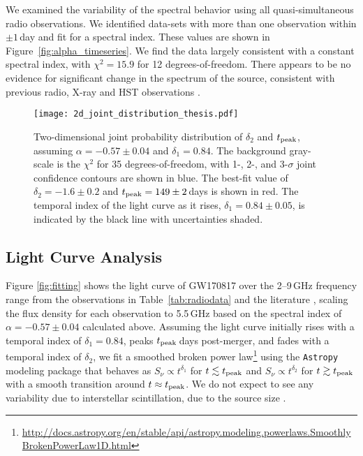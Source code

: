 We examined the variability of the spectral behavior using all quasi-simultaneous radio observations. We identified data-sets with more than one observation within $\pm1\,$day and fit for a spectral index. These values are shown in Figure~\ref{fig:alpha_timeseries}. We find the data largely consistent with a constant spectral index, with $\chi^2=15.9$ for 12 degrees-of-freedom. There appears to be no evidence for significant change in the spectrum of the source, consistent with previous radio, X-ray and HST observations \citep{2018A&A...613L...1D,2018NatAs...2..751L,2018Natur.554..207M,2018ApJ...856L..18M,2018ApJ...867...57R}. 

\begin{figure}[h!]
\texttt{[image: 2d\_joint\_distribution\_thesis.pdf]}
\caption[Joint probability distribution of the peak time and decay index of the GW170817 non-thermal afterglow]{Two-dimensional joint probability distribution of $\delta_2$ and $t_{\rm peak}$, assuming $\alpha=-0.57\pm 0.04$ and $\delta_1=0.84$. The background gray-scale is the $\chi^2$ for 35 degrees-of-freedom, with 1-, 2-, and 3-$\sigma$ joint confidence contours are shown in blue. The best-fit value of $\delta_2=-1.6\pm0.2$ and $t_{\rm peak}=149\pm2\,$days is shown in red. The temporal index of the light curve as it rises, $\delta_1=0.84\pm0.05$, is indicated by the black line with uncertainties shaded. \label{fig:joint_distribution}}
\end{figure}

\subsection{Light Curve Analysis} \label{subsec:light curve}
Figure \ref{fig:fitting} shows the light curve of GW170817 over the 2--9\,GHz frequency range from the observations in Table~\ref{tab:radiodata} and the literature \citep{2017Sci...358.1579H,2018Natur.554..207M,2018ApJ...856L..18M}, scaling the flux density for each observation to 5.5\,GHz based on the spectral index of $\alpha=-0.57\pm 0.04$ calculated above. Assuming the light curve initially rises with a temporal index of $\delta_1=0.84$, peaks $t_{\rm peak}$\,days post-merger, and fades with a temporal index of $\delta_2$, we fit a smoothed broken power law\footnote{\url{http://docs.astropy.org/en/stable/api/astropy.modeling.powerlaws.SmoothlyBrokenPowerLaw1D.html}} using the \texttt{Astropy} modeling package \citep{2018AJ....156..123A} that behaves as $S_\nu\propto t^{\delta_1}$ for $t\lesssim t_{\rm peak}$ and $S_\nu\propto t^{\delta_2}$ for $t\gtrsim t_{\rm peak}$ with a smooth transition around $t\approx t_{\rm peak}$. We do not expect to see any variability due to interstellar scintillation, due to the source size \citep{2017Sci...358.1579H}.

